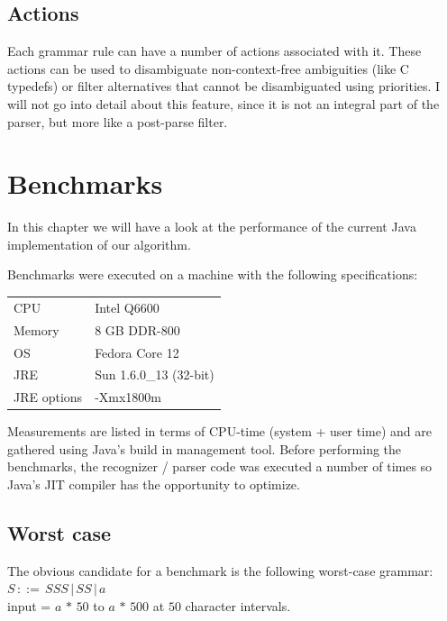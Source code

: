 \documentclass[a4paper,10pt]{article}
\begin{document}
\subsection{Actions}

Each grammar rule can have a number of actions associated with it. These actions can be used to disambiguate non-context-free ambiguities (like C typedefs) or filter alternatives that cannot be disambiguated using priorities. I will not go into detail about this feature, since it is not an integral part of the parser, but more like a post-parse filter.

\section{Benchmarks}

In this chapter we will have a look at the performance of the current Java implementation of our algorithm.

Benchmarks were executed on a machine with the following specifications:
\begin{table}[H]
\centering
\begin{tabular}{ | p{6em} | p{9em} | }
 \hline
 CPU & Intel Q6600 \\
 Memory & 8 GB DDR-800 \\
 OS & Fedora Core 12 \\
 JRE & Sun 1.6.0\_13 (32-bit) \\
 JRE options & -Xmx1800m \\
 \hline
\end{tabular}
\end{table}

Measurements are listed in terms of CPU-time (system + user time) and are gathered using Java's build in management tool. Before performing the benchmarks, the recognizer / parser code was executed a number of times so Java's JIT compiler has the opportunity to optimize.

\subsection{Worst case}

The obvious candidate for a benchmark is the following worst-case grammar:
$S\,::=\,SSS\,|\,SS\,|\,a$\\
input = $a\,*\,50$ to $a\,*\,500$ at $50$ character intervals.
\end{document}
